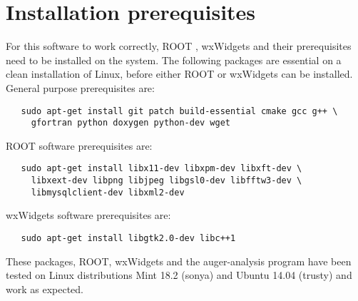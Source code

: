 \documentclass[12pt,a4paper]{report}
\begin{document}
\section{Installation prerequisites}
For this software to work correctly, ROOT \cite{root}, wxWidgets \cite{wxWidgets} and their prerequisites need to be installed on the system. The following packages are essential on a clean installation of Linux, before either ROOT or wxWidgets can be installed. General purpose prerequisites are:
\begin{verbatim}
   sudo apt-get install git patch build-essential cmake gcc g++ \
     gfortran python doxygen python-dev wget
\end{verbatim}
ROOT software prerequisites are:
\begin{verbatim}
   sudo apt-get install libx11-dev libxpm-dev libxft-dev \
     libxext-dev libpng libjpeg libgsl0-dev libfftw3-dev \
     libmysqlclient-dev libxml2-dev
\end{verbatim}
wxWidgets software prerequisites are:
\begin{verbatim}
   sudo apt-get install libgtk2.0-dev libc++1
\end{verbatim}
These packages, ROOT, wxWidgets and the auger-analysis program have been tested on Linux distributions Mint 18.2 (sonya) and Ubuntu 14.04 (trusty) and work as expected.
\end{document}
